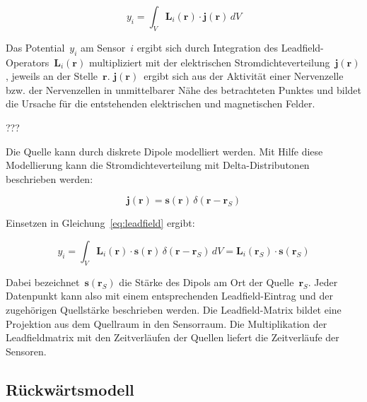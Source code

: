 \documentclass[doc,a4paper,12pt]{apa6}
\newcommand{\mx}[1]{\mathbf{#1}}
\begin{document}
\begin{equation}
y_i = \int_V \mx{L}_i (\mx{r}) \cdot \mx{j} (\mx{r})\, dV
\label{eq:leadfield}
\end{equation}

Das Potential~$y_i$ am Sensor~$i$ ergibt sich durch Integration des Leadfield-Operators~$\mx{L}_i(\mx{r})$ multipliziert mit der elektrischen Stromdichteverteilung~$\mx{j}(\mx{r})$, jeweils an der Stelle~$\mx{r}$. $\mx{j}(\mx{r})$~ergibt sich aus der Aktivität einer Nervenzelle bzw. der Nervenzellen in unmittelbarer Nähe des betrachteten Punktes und bildet die Ursache für die entstehenden elektrischen und magnetischen Felder.

???


Die Quelle kann durch diskrete Dipole modelliert werden. Mit Hilfe diese Modellierung kann die Stromdichteverteilung mit Delta-Distributonen beschrieben werden:

\begin{equation}
\mx{j} (\mx{r}) = \mx{s}(\mx{r})\,\delta(\mx{r}-\mx{r}_S)
\end{equation}

Einsetzen in Gleichung~\ref{eq:leadfield} ergibt:

\begin{equation}
y_i = \int_V \mx{L}_i (\mx{r}) \cdot \mx{s}(\mx{r})\,\delta(\mx{r}-\mx{r}_S)\, dV = \mx{L}_i(\mx{r}_S) \cdot \mx{s}(\mx{r}_S)
\label{eq:leadfield2}
\end{equation}

Dabei bezeichnet~$\mx{s}(\mx{r}_S)$ die Stärke des Dipols am Ort der Quelle~$\mx{r}_S$. Jeder Datenpunkt kann also mit einem entsprechenden Leadfield-Eintrag und der zugehörigen Quellstärke beschrieben werden. Die Leadfield-Matrix bildet eine Projektion aus dem Quellraum in den Sensorraum. Die Multiplikation der Leadfieldmatrix mit den Zeitverläufen der Quellen liefert die Zeitverläufe der Sensoren.



\subsection{Rückwärtsmodell}
\end{document}
